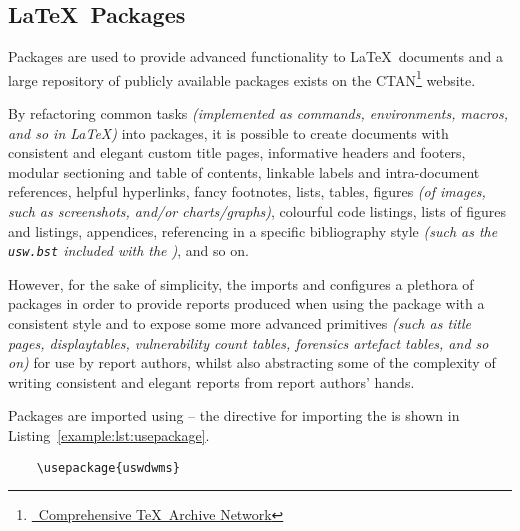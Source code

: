 \subsection{\LaTeX\ Packages}
Packages are used to provide advanced functionality to \LaTeX\ documents and a large repository of publicly available packages exists on the CTAN\footnote{\href{https://ctan.org/?lang=en}{\faExternalLinkSquare*\ Comprehensive \TeX\ Archive Network}} website.

By refactoring common tasks \textit{(implemented as commands, environments, macros, and so in \LaTeX{})} into packages, it is possible to create documents with consistent and elegant custom title pages, informative headers and footers, modular sectioning and table of contents, linkable labels and intra-document references, helpful hyperlinks, fancy footnotes, lists, tables, figures \textit{(of images, such as screenshots, and/or charts/graphs)}, colourful code listings, lists of figures and listings, appendices, referencing in a specific bibliography style \textit{(such as the \texttt{usw.bst} included with the \uswdwmspkg{})}, and so on.

However, for the sake of simplicity, the \uswdwmspkg{} imports and configures a plethora of packages in order to provide reports produced when using the package with a consistent style and to expose some more advanced primitives \textit{(such as title pages, displaytables, vulnerability count tables, forensics artefact tables, and so on)} for use by report authors, whilst also abstracting some of the complexity of writing consistent and elegant reports from report authors' hands.

Packages are imported using  -- the directive for importing the \uswdwmspkg{} is shown in Listing~\ref{example:lst:usepackage}.


\begin{listing}[H]
  \captionsetup{skip=\skiplistingcaptionlen}
  \begin{verbatim}
    \usepackage{uswdwms}
  \end{verbatim}
  \caption{\texttt{\textbackslash usepackage} command example}
  \label{example:lst:usepackage}
\end{listing}
